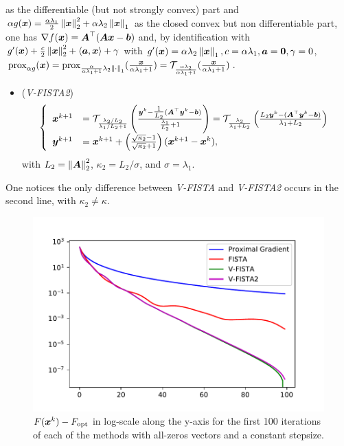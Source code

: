 as the differentiable (but not strongly convex) part and 
$\alpha g(\boldsymbol x) = \frac{\alpha\lambda_1}{2} \left\lVert\boldsymbol x\right\rVert_{2}^2 
+ \alpha\lambda_2 \left\lVert\boldsymbol x\right\rVert_{1}$ as the closed 
convex but non differentiable part, one has 
$\nabla f(\boldsymbol x) = \boldsymbol A^\top (\boldsymbol{Ax}-\boldsymbol b)$ and, 
by identification with $g'(\boldsymbol x) + \frac{c}{2} 
\left\lVert\boldsymbol x\right\rVert_{2}^2 + \langle \boldsymbol a, \boldsymbol x \rangle + \gamma$ with 
$g'(\boldsymbol x) = \alpha\lambda_2 \left\lVert\boldsymbol x\right\rVert_{1}, 
c=\alpha\lambda_1, \boldsymbol a=\boldsymbol 0, \gamma=0$, 
$\operatorname{prox}_{\alpha g}(\boldsymbol x) = 
\operatorname{prox}_{\frac{\alpha}{\alpha\lambda_1+1} \lambda_2 
\left\lVert\cdot\right\rVert_{1}} (\frac{\boldsymbol x}{\alpha\lambda_1+1}) = 
\mathcal T_{\frac{\alpha\lambda_2}{\alpha\lambda_1+1}} 
(\frac{\boldsymbol x}{\alpha\lambda_1+1})$.
%
\begin{itemize}
    \item (\emph{V-FISTA2})
    \begin{align*}
    \begin{split}
        \left\{
        \begin{array}{ll}
            \boldsymbol x^{k+1} &= \mathcal T_{\frac{\lambda_2/L_2}{
            \lambda_1/L_2 + 1}} 
            \left( \frac{\boldsymbol y^k - {\textstyle\frac{1}{L_2}} (\boldsymbol A^\top 
            \boldsymbol y^k-\boldsymbol b) }{\frac{\lambda_1}{L_2}+1} \right)
            = \mathcal T_{\frac{\lambda_2}{
                \lambda_1 + L_2}} 
                \left( \frac{L_2\boldsymbol y^k - (\boldsymbol A^\top 
                \boldsymbol y^k-\boldsymbol b) }{\lambda_1+L_2} \right) \\
            \boldsymbol y^{k+1} &= \boldsymbol x^{k+1} + \left( 
            \frac{\sqrt{\kappa_2}-1}{\sqrt{\kappa_2}+1} 
            \right) (\boldsymbol x^{k+1}- \boldsymbol x^k),
        \end{array}
        \right.
    \end{split}
    \end{align*}
    with $L_2=\left\lVert\boldsymbol A\right\rVert_{2}^2$, $\kappa_2=L_2/\sigma$, 
    and $\sigma=\lambda_1$.
\end{itemize}
%
One notices the only difference between \emph{V-FISTA} and 
\emph{V-FISTA2} occurs in the second line, with $\kappa_2
\neq \kappa$.
%
\begin{figure}[H]
    \centering
    \includegraphics[width=14cm]{images/part2_ex0.pdf}
    \caption{$F(\boldsymbol x^k)-F_{\text{opt}}$ in log-scale along the 
  y-axis for the first 100 iterations of each of the methods 
  with all-zeros vectors and a constant stepsize. }
  \label{fig: ex0}
\end{figure}
